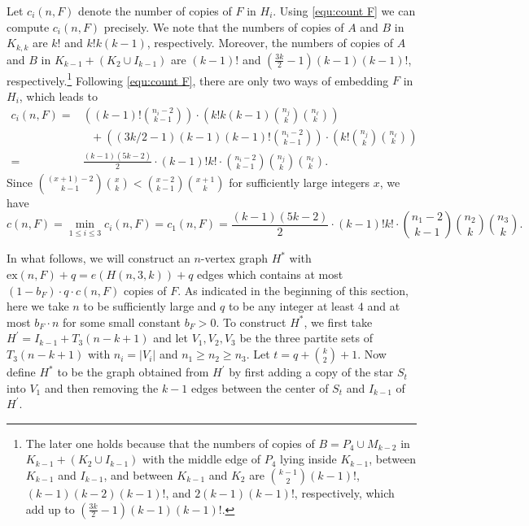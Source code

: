 \documentclass[10pt]{article}
\def\ex{\mathrm{ex}}
\begin{document}
Let $c_i(n,F)$ denote the number of copies of $F$ in $H_i$.
Using \eqref{equ:count F} we can compute $c_i(n,F)$ precisely.
We note that the numbers of copies of $A$ and $B$ in $K_{k,k}$ are $k!$ and $k!k(k-1)$, respectively.
Moreover, the numbers of copies of $A$ and $B$ in $K_{k-1}+(K_2\cup I_{k-1})$ are $(k-1)!$ and $(\frac{3k}{2}-1)(k-1)(k-1)!$, respectively.\footnote{
The later one holds because that the numbers of copies of $B=P_4\cup M_{k-2}$ in $K_{k-1}+(K_2\cup I_{k-1})$ with the middle edge of $P_4$ lying inside $K_{k-1}$, between $K_{k-1}$ and $I_{k-1}$,
and between $K_{k-1}$ and $K_2$ are ${k-1 \choose 2}(k-1)!$,  $(k-1)(k-2)(k-1)!$, and $2(k-1)(k-1)!$, respectively, which add up to $(\frac{3k}{2}-1)(k-1)(k-1)!$.}
Following \eqref{equ:count F}, there are only two ways of embedding $F$ in $H_i$, which leads to
\begin{align*}
c_i(n,F)=& \left((k-1)!{n_i-2 \choose k-1}\right)\cdot \left(k!k(k-1){n_j \choose k}{n_\ell \choose k}\right)\\
&~~~ + \left((3k/2-1)(k-1)(k-1)!{n_i-2 \choose k-1}\right)\cdot \left(k!{n_j \choose k}{n_\ell \choose k}\right)\\
=&\frac{(k-1)(5k-2)}{2}\cdot (k-1)!k!\cdot {n_i-2 \choose k-1}{n_j \choose k}{n_\ell \choose k}.
\end{align*}
Since ${(x+1)-2 \choose k-1}{x \choose k}<{x-2 \choose k-1}{x+1 \choose k}$ for sufficiently large integers $x$, we have
\begin{equation}\label{eq1-for-counter-example}
c(n,F)=\min_{1\leq i\leq 3} c_i(n,F)=c_1(n,F)=\frac{(k-1)(5k-2)}{2}\cdot (k-1)!k!\cdot {n_1-2 \choose k-1}{n_2 \choose k}{n_3 \choose k}.
\end{equation}


In what follows, we will construct an $n$-vertex graph $H^*$ with $\ex(n,F)+q=e(H(n,3,k))+q$ edges which contains at most $(1-b_F)\cdot q\cdot c(n,F)$ copies of $F$.
As indicated in the beginning of this section, here we take $n$ to be sufficiently large and $q$ to be any integer at least $4$ and at most $b_F\cdot n$ for some small constant $b_F>0$.
To construct $H^*$, we first take $H^\prime=I_{k-1}+T_3(n-k+1)$ and let $V_1, V_2, V_3$ be the three partite sets of $T_3(n-k+1)$ with $n_i=|V_i|$ and $n_1\geq n_2\geq n_3$.
Let $t=q+{k\choose 2}+1$.
Now define $H^*$ to be the graph obtained from $H^\prime$ by first adding a copy of the star $S_{t}$ into $V_1$ and then removing the $k-1$ edges between the center of $S_{t}$ and $I_{k-1}$ of $H^\prime$.
\end{document}
